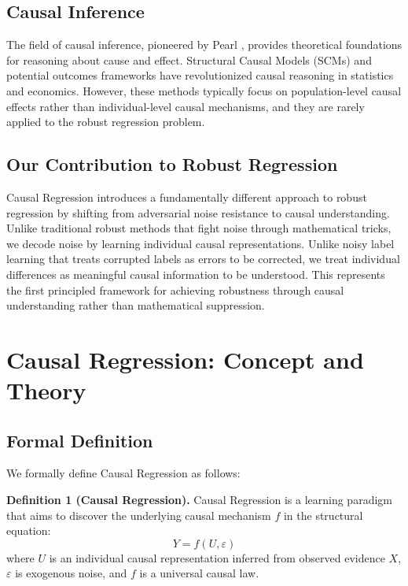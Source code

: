 \documentclass[letterpaper]{article} %
\begin{document}
\subsection{Causal Inference}
The field of causal inference, pioneered by Pearl \cite{pearl2009causality}, provides theoretical foundations for reasoning about cause and effect. Structural Causal Models (SCMs) \cite{spirtes2000causation} and potential outcomes frameworks \cite{imbens2015causal} have revolutionized causal reasoning in statistics and economics. However, these methods typically focus on population-level causal effects rather than individual-level causal mechanisms, and they are rarely applied to the robust regression problem.

\subsection{Our Contribution to Robust Regression}
Causal Regression introduces a fundamentally different approach to robust regression by shifting from adversarial noise resistance to causal understanding. Unlike traditional robust methods that fight noise through mathematical tricks, we decode noise by learning individual causal representations. Unlike noisy label learning that treats corrupted labels as errors to be corrected, we treat individual differences as meaningful causal information to be understood. This represents the first principled framework for achieving robustness through causal understanding rather than mathematical suppression.

\section{Causal Regression: Concept and Theory}

\subsection{Formal Definition}

We formally define Causal Regression as follows:

\textbf{Definition 1 (Causal Regression).} Causal Regression is a learning paradigm that aims to discover the underlying causal mechanism $f$ in the structural equation:
\begin{equation}
Y = f(U, \varepsilon)
\end{equation}
where $U$ is an individual causal representation inferred from observed evidence $X$, $\varepsilon$ is exogenous noise, and $f$ is a universal causal law.
\end{document}
